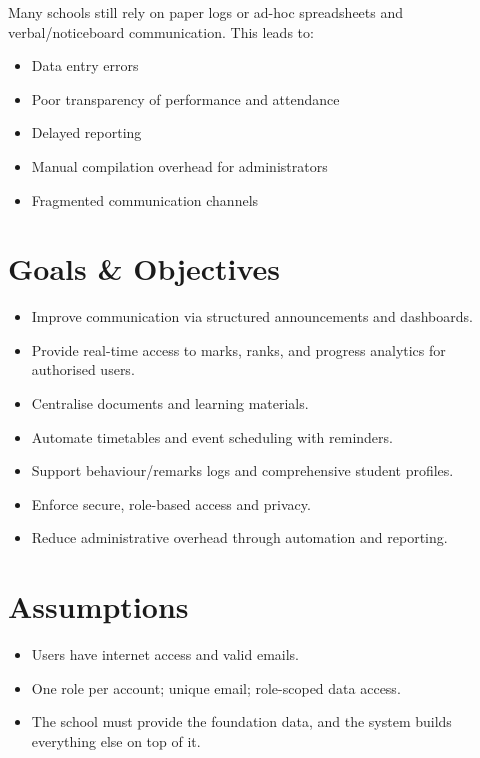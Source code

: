 \documentclass[12pt, a4paper]{report}
\begin{document}
Many schools still rely on paper logs or ad-hoc spreadsheets and verbal/noticeboard communication. This leads to:
\begin{itemize}
    \item Data entry errors
    \item Poor transparency of performance and attendance
    \item Delayed reporting
    \item Manual compilation overhead for administrators
    \item Fragmented communication channels
\end{itemize}

\section{Goals \& Objectives}

\begin{itemize}
    \item Improve communication via structured announcements and dashboards.
    \item Provide real-time access to marks, ranks, and progress analytics for authorised users.
    \item Centralise documents and learning materials.
    \item Automate timetables and event scheduling with reminders.
    \item Support behaviour/remarks logs and comprehensive student profiles.
    \item Enforce secure, role-based access and privacy.
    \item Reduce administrative overhead through automation and reporting.
\end{itemize}

\section{Assumptions}

\begin{itemize}
    \item Users have internet access and valid emails.
    \item One role per account; unique email; role-scoped data access.
    \item The school must provide the foundation data, and the system builds everything else on top of it.
\end{itemize}
\end{document}
